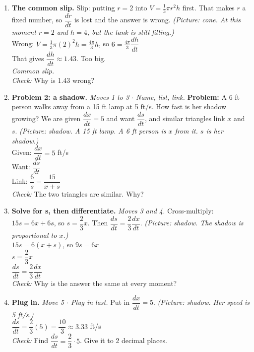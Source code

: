 \documentclass[11pt]{article}
\begin{document}
\begin{enumerate}
\item \textbf{The common slip.} Slip: putting $r=2$ into $V=\tfrac13\pi r^2h$ first. That makes $r$ a fixed number, so $\dfrac{dr}{dt}$ is lost and the answer is wrong. \textit{(Picture: cone. At this moment $r=2$ and $h=4$, but the tank is still filling.)}\\ Wrong: $V=\tfrac13\pi(2)^2h=\tfrac{4\pi}{3}h$, so $6=\tfrac{4\pi}{3}\dfrac{dh}{dt}$\\ That gives $\dfrac{dh}{dt}\approx1.43$. Too big.\\ \textit{Common slip.}\\ \textit{Check:} Why is 1.43 wrong? 
\item \textbf{Problem 2: a shadow.} \textit{Moves 1 to 3 $\cdot$ Name, list, link.} \textbf{Problem:} A 6 ft person walks away from a 15 ft lamp at 5 ft/s. How fast is her shadow growing? We are given $\dfrac{dx}{dt}=5$ and want $\dfrac{ds}{dt}$, and similar triangles link $x$ and $s$. \textit{(Picture: shadow. A 15 ft lamp. A 6 ft person is $x$ from it. $s$ is her shadow.)}\\ Given: $\dfrac{dx}{dt}=5$ ft/s\\ Want: $\dfrac{ds}{dt}$\\ Link: $\dfrac{6}{s}=\dfrac{15}{x+s}$\\ \textit{Check:} The two triangles are similar. Why? 
\item \textbf{Solve for s, then differentiate.} \textit{Moves 3 and 4.} Cross-multiply: $15s=6x+6s$, so $s=\dfrac23x$. Then $\dfrac{ds}{dt}=\dfrac23\dfrac{dx}{dt}$. \textit{(Picture: shadow. The shadow is proportional to $x$.)}\\ $15s=6(x+s)$, so $9s=6x$\\ $s=\dfrac23x$\\ $\dfrac{ds}{dt}=\dfrac23\dfrac{dx}{dt}$\\ \textit{Check:} Why is the answer the same at every moment? 
\item \textbf{Plug in.} \textit{Move 5 $\cdot$ Plug in last.} Put in $\dfrac{dx}{dt}=5$. \textit{(Picture: shadow. Her speed is 5 ft/s.)}\\ $\dfrac{ds}{dt}=\dfrac23(5)=\dfrac{10}{3}\approx3.33$ ft/s\\ \textit{Check:} Find $\dfrac{ds}{dt}=\dfrac23\cdot5$. Give it to 2 decimal places. 
\end{enumerate}
\end{document}
